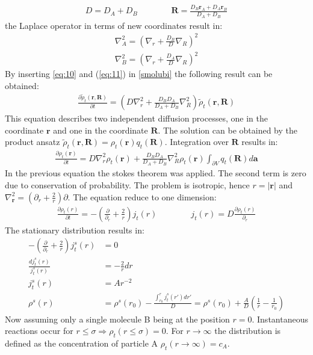 \documentclass[
  a4paper,BCOR10mm,oneside,
  bibtotoc,idxtotoc,
  headsepline,footsepline,%
  fleqn,openbib
]{scrbook}
\begin{document}
\begin{align}
 D= D_A+D_B \qquad \qquad \bm{R}=\frac{D_B \bm{r}_A+ D_A \bm{r}_B}{D_A+D_B}
\end{align}
the Laplace operator in terms of new coordinates result in:
\begin{align}
\nabla^{2}_{A} = \left( \nabla_r+\frac{D_B}{D} \nabla_R \right)^2 \label{eq:10}\\
\nabla^{2}_{B} = \left( \nabla_r+\frac{D_A}{D} \nabla_R \right)^2 \label{eq:11}
\end{align}
By inserting \cref{eq:10}  and (\ref{eq:11}) in \cref{smolubi} the following result can be obtained:
\begin{align}
 \frac{\partial \tilde{\rho}_t(\bm{r},\bm{R})}{\partial t}=\left(D \nabla^{2}_{r}+\frac{D_B D_A}{D_A+D_B}\nabla^{2}_{R}\right) \tilde{\rho}_t(\bm{r},\bm{R})
\end{align}
This equation describes two independent diffusion processes, one in the coordinate $\bm{r}$ and one in the coordinate $\bm{R}$. The solution can be obtained by the product ansatz $\tilde{\rho}_t(\bm{r},\bm{R})=\rho_t(\bm{r})q_t(\bm{R})$. Integration over $\bm{R}$ results in:
\begin{align}
\frac{\partial \rho_t(\bm{r})}{\partial t}=D \nabla^{2}_{r} \rho_t(\bm{r}) +\frac{D_B D_A}{D_A+D_B} \nabla^{2}_{R} \rho_t(\bm{r}) \int_{\partial V} q_t(\bm{R}) d \bm{a}
\end{align}
In the previous equation the stokes theorem was applied. The second term is zero due to conservation of probability. The problem is isotropic, hence $r=|\bm{r}|$ and $\nabla^{2}_{\bm{r}}=\left(\partial_r+\frac{2}{r}\right)\partial$. The equation reduce to one dimension:
\begin{align} \label{smoluchwoskionedimension}
\frac{\partial \rho_t(r)}{\partial t}=-\left(\frac{\partial}{\partial_r}+\frac{2}{r} \right) j_t(r) \qquad \qquad j_t(r)=D \frac{\partial\rho_t(r)}{\partial_r}
\end{align}
 The stationary distribution results in:
\begin{align}
 -\left(\frac{\partial}{\partial_r}+\frac{2}{r} \right) j^{s}_t(r)&= 0\\
 \frac{d j^{s}_t(r)}{j^{s}_t(r)}  &=- \frac{2}{r} dr\\
 j^{s}_t(r)&=A r^{-2}\\
 \rho^s(r)&=\rho^s(r_0)- \frac{\int_{r_0}^{r} j^{s}_t(r')dr'}{D}=\rho^s(r_0)+\frac{A}{D}\left(\frac{1}{r}-\frac{1}{r_0}\right)
\end{align}
Now assuming only a single molecule B being at the position $r=0$. Instantaneous reactions occur for $r\leq \sigma \Rightarrow \rho_t(r \leq \sigma)=0$. For $r \rightarrow \infty$ the distribution is defined as the concentration of particle A $\rho_t(r \rightarrow \infty)=c_A$.
\end{document}
